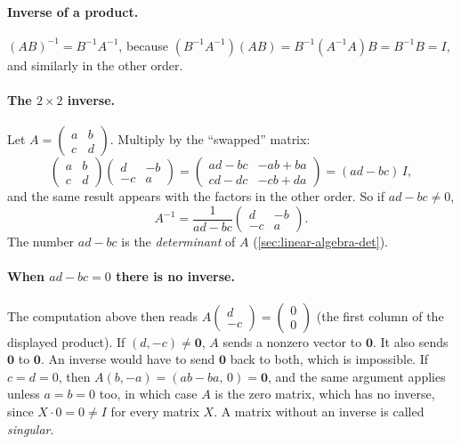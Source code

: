 \paragraph{Inverse of a product.} $(AB)^{-1}=B^{-1}A^{-1}$, because $(B^{-1}A^{-1})(AB)=B^{-1}(A^{-1}A)B=B^{-1}B=I$, and similarly in the other order.

\paragraph{The $2\times2$ inverse.} Let $A=\begin{pmatrix}a&b\\c&d\end{pmatrix}$. Multiply by the ``swapped'' matrix:
\[
\begin{pmatrix}a&b\\c&d\end{pmatrix}\begin{pmatrix}d&-b\\-c&a\end{pmatrix}=\begin{pmatrix}ad-bc&-ab+ba\\cd-dc&-cb+da\end{pmatrix}=(ad-bc)\,I ,
\]
and the same result appears with the factors in the other order. So if $ad-bc\ne0$,
\begin{equation}
A^{-1}=\frac{1}{ad-bc}\begin{pmatrix}d&-b\\-c&a\end{pmatrix}.
\label{eq:linear-algebra-inv2}
\end{equation}
The number $ad-bc$ is the \emph{determinant} of $A$ (\cref{sec:linear-algebra-det}).

\paragraph{When $ad-bc=0$ there is no inverse.} The computation above then reads $A\begin{pmatrix}d\\-c\end{pmatrix}=\begin{pmatrix}0\\0\end{pmatrix}$ (the first column of the displayed product). If $(d,-c)\ne\bm 0$, $A$ sends a nonzero vector to $\bm 0$. It also sends $\bm 0$ to $\bm 0$. An inverse would have to send $\bm 0$ back to both, which is impossible. If $c=d=0$, then $A(b,-a)=(ab-ba,\,0)=\bm 0$, and the same argument applies unless $a=b=0$ too, in which case $A$ is the zero matrix, which has no inverse, since $X\cdot0=0\ne I$ for every matrix $X$. A matrix without an inverse is called \emph{singular}.

